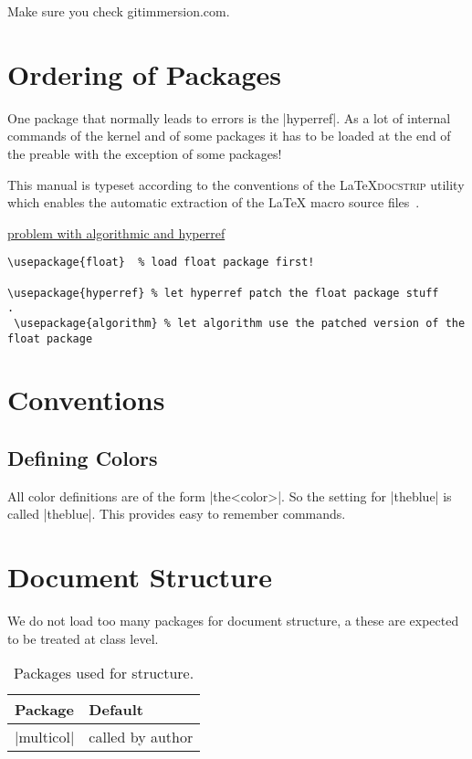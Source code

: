 Make sure you check gitimmersion.com.

  


 

 \section{Ordering of Packages}
 
 One package that normally leads to errors is the 
 |hyperref|. As a lot of internal commands of the kernel
 and of some packages it has to be loaded at the end
 of the preable with the exception of some packages! 
 
 This manual is typeset according to the conventions of the
 \LaTeX \textsc{docstrip} utility which enables the automatic
 extraction of the \LaTeX{} macro source files~\cite{GOOSSENS94}.

 
 \href{http://tex.stackexchange.com/questions/96350/problem-with-algorithmic-and-hyperref}{problem with algorithmic and hyperref}
 \begin{verbatim}
\usepackage{float}  % load float package first!

\usepackage{hyperref} % let hyperref patch the float package stuff
.
 \usepackage{algorithm} % let algorithm use the patched version of the float package
 \end{verbatim}
 \section{Conventions}
 \subsection{Defining Colors}
 All color definitions are of the form |the<color>|. So the setting for |theblue| is called
 |theblue|. This provides easy to remember commands.
 
 \section{Document Structure}
 We do not load too many packages for document structure, a these are expected to be
 treated at class level.
 \begin{table}[ht]
 \centering
 \caption{Packages used for structure.}
 \begin{tabular}{ll}
   \toprule
   Package  & Default\\
   \midrule
   |multicol| & called by author  \\
   \bottomrule
 \end{tabular}
 \end{table}















